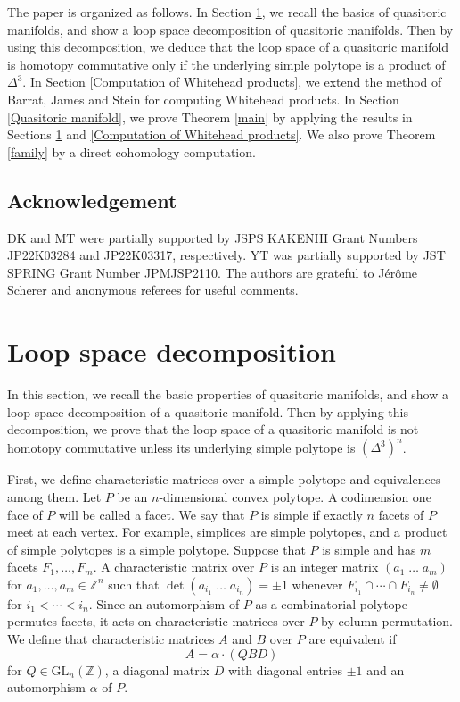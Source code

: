 \documentclass[a4paper]{amsart}
\numberwithin{equation}{section}
\theoremstyle{definition}
\theoremstyle{remark}
\numberwithin{equation}{section}
\newcommand{\Z}{\mathbb{Z}}
\begin{document}
The paper is organized as follows. In Section \ref{Loop space decomposition}, we recall the basics of quasitoric manifolds, and show a loop space decomposition of quasitoric manifolds. Then by using this decomposition, we deduce that the loop space of a quasitoric manifold is homotopy commutative only if the underlying simple polytope is a product of $\Delta^3$. In Section \ref{Computation of Whitehead products}, we extend the method of Barrat, James and Stein \cite{BJS} for computing Whitehead products. In Section \ref{Quasitoric manifold}, we prove Theorem \ref{main} by applying the results in Sections \ref{Loop space decomposition} and \ref{Computation of Whitehead products}. We also prove Theorem \ref{family} by a direct cohomology computation.



\subsection*{Acknowledgement}


DK and MT were partially supported by JSPS KAKENHI Grant Numbers JP22K03284 and JP22K03317, respectively. YT was partially supported by JST SPRING Grant Number JPMJSP2110. The authors are grateful to J\'{e}r\^{o}me Scherer and anonymous referees for useful comments.




\section{Loop space decomposition}\label{Loop space decomposition}

In this section, we recall the basic properties of quasitoric manifolds, and show a loop space decomposition of a quasitoric manifold. Then by applying this decomposition, we prove that the loop space of a quasitoric manifold is not homotopy commutative unless its underlying simple polytope is $(\Delta^3)^n$.



First, we define characteristic matrices over a simple polytope and equivalences among them. Let $P$ be an $n$-dimensional convex polytope. A codimension one face of $P$ will be called a facet. We say that $P$ is simple if exactly $n$ facets of $P$ meet at each vertex. For example, simplices are simple polytopes, and a product of simple polytopes is a simple polytope. Suppose that $P$ is simple and has $m$ facets $F_1,\ldots,F_m$. A characteristic matrix over $P$ is an integer matrix $(a_1\;\ldots\;a_m)$ for $a_1,\ldots,a_m\in\Z^n$ such that $\det(a_{i_1}\;\ldots\;a_{i_n})=\pm 1$ whenever $F_{i_1}\cap\cdots\cap F_{i_n}\ne\emptyset$ for $i_1<\cdots<i_n$. Since an automorphism of $P$ as a combinatorial polytope permutes facets, it acts on characteristic matrices over $P$ by column permutation. We define that characteristic matrices $A$ and $B$ over $P$ are equivalent if
\begin{equation}
  \label{equivalence matrix}
  A=\alpha\cdot(QBD)
\end{equation}
for $Q\in\mathrm{GL}_n(\Z)$, a diagonal matrix $D$ with diagonal entries $\pm 1$ and an automorphism $\alpha$ of $P$.
\end{document}
